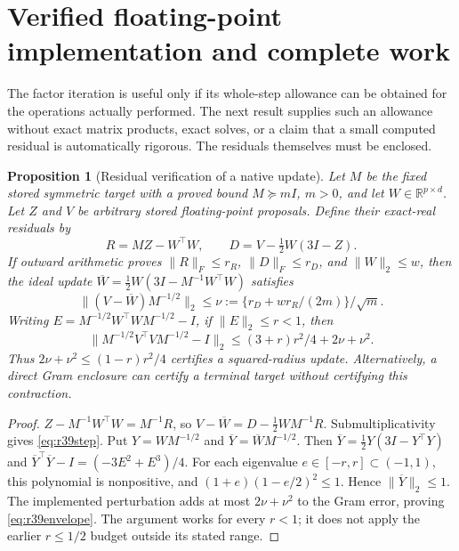 \documentclass[ecta,nameyear,draft]{econsocart}
\newtheorem{proposition}[theorem]{Proposition}
\theoremstyle{definition}
\theoremstyle{remark}
\newcommand{\R}{\mathbb R}
\begin{document}
\section{Verified floating-point implementation and complete work}
\label{sec:r39floating}

The factor iteration is useful only if its whole-step allowance can be
obtained for the operations actually performed. The next result supplies such
an allowance without exact matrix products, exact solves, or a claim that a
small computed residual is automatically rigorous. The residuals themselves
must be enclosed.

\begin{proposition}[Residual verification of a native update]
\label{prop:r39floating}
Let $M$ be the fixed stored symmetric target with a proved bound $M\succeq mI$,
$m>0$, and let $W\in\R^{p\times d}$. Let $Z$ and $V$ be arbitrary stored
floating-point proposals. Define their exact-real residuals by
\[
 R=MZ-W^\top W,\qquad D=V-\tfrac12W(3I-Z).
\]
If outward arithmetic proves $\|R\|_F\leq r_R$, $\|D\|_F\leq r_D$, and
$\|W\|_2\leq w$, then the ideal update
$\overline W=\tfrac12W(3I-M^{-1}W^\top W)$ satisfies
\begin{equation}\label{eq:r39step}
 \|(V-\overline W)M^{-1/2}\|_2
 \leq \nu:=\{r_D+wr_R/(2m)\}/\sqrt m.
\end{equation}
Writing $E=M^{-1/2}W^\top WM^{-1/2}-I$, if $\|E\|_2\leq r<1$, then
\begin{equation}\label{eq:r39envelope}
 \|M^{-1/2}V^\top VM^{-1/2}-I\|_2
 \leq (3+r)r^2/4+2\nu+\nu^2.
\end{equation}
Thus $2\nu+\nu^2\leq(1-r)r^2/4$ certifies a squared-radius update.
Alternatively, a direct Gram enclosure can certify a terminal target without
certifying this contraction.
\end{proposition}
\begin{proof}
$Z-M^{-1}W^\top W=M^{-1}R$, so
$V-\overline W=D-\tfrac12WM^{-1}R$. Submultiplicativity gives
\eqref{eq:r39step}. Put $Y=WM^{-1/2}$ and $\overline Y=\overline WM^{-1/2}$.
Then $\overline Y=\tfrac12Y(3I-Y^\top Y)$ and
$\overline Y^\top\overline Y-I=(-3E^2+E^3)/4$.
For each eigenvalue $e\in[-r,r]\subset(-1,1)$, this polynomial is nonpositive,
and $(1+e)(1-e/2)^2\leq1$. Hence $\|\overline Y\|_2\leq1$.
The implemented perturbation adds at most $2\nu+\nu^2$ to the Gram error,
proving \eqref{eq:r39envelope}. The argument works for every $r<1$; it does
not apply the earlier $r\leq1/2$ budget outside its stated range.
\end{proof}
\end{document}
